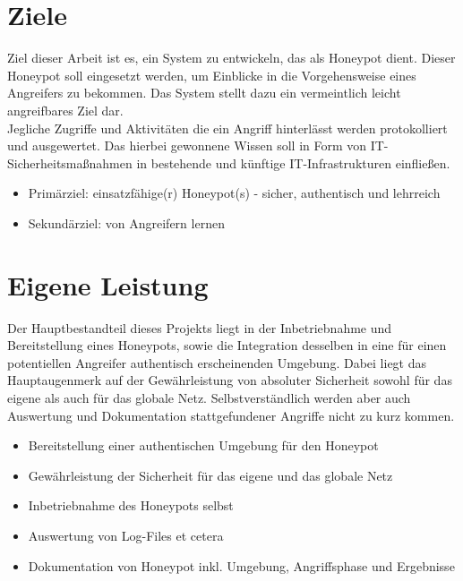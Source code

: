 \newpage


\section{Ziele}
\label{subsec:Ziele}

Ziel dieser Arbeit ist es, ein System zu entwickeln, das als Honeypot dient. Dieser Honeypot soll eingesetzt werden, um Einblicke in die Vorgehensweise eines Angreifers zu bekommen. Das System stellt dazu ein vermeintlich leicht angreifbares Ziel dar.\\

Jegliche Zugriffe und Aktivitäten die ein Angriff hinterlässt werden protokolliert und ausgewertet. Das hierbei gewonnene Wissen soll in Form von IT-Sicherheitsmaßnahmen in bestehende und künftige IT-Infrastrukturen einfließen.\\

\begin{itemize}
\item Primärziel: einsatzfähige(r) Honeypot(s) - sicher, authentisch und lehrreich
\item Sekundärziel: von Angreifern lernen
\end{itemize}




\section{Eigene Leistung}
\label{subsec:Eigene Leistung}

Der Hauptbestandteil dieses Projekts liegt in der Inbetriebnahme und Bereitstellung eines Honeypots, sowie die Integration desselben in eine für einen potentiellen Angreifer authentisch erscheinenden Umgebung. Dabei liegt das Hauptaugenmerk auf der Gewährleistung von absoluter Sicherheit sowohl für das eigene als auch für das globale Netz. Selbstverständlich werden aber auch Auswertung und Dokumentation stattgefundener Angriffe nicht zu kurz kommen.

\begin{itemize}
\item Bereitstellung einer authentischen Umgebung für den Honeypot
\item Gewährleistung der Sicherheit für das eigene und das globale Netz
\item Inbetriebnahme des Honeypots selbst
\item Auswertung von Log-Files et cetera
\item Dokumentation von Honeypot inkl. Umgebung, Angriffsphase und Ergebnisse
\end{itemize}


